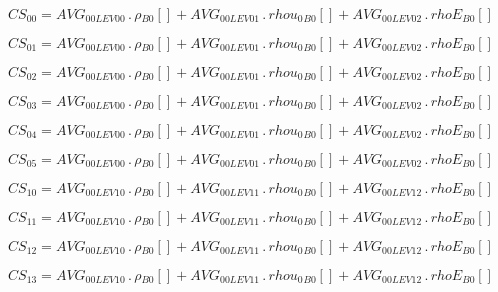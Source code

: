 \documentclass{article}
\begin{document}
\begin{dmath}CS_{00} = AVG_{0 0 LEV 00} \,.\, {\rho{_{B0}}}[{}] + AVG_{0 0 LEV 01} \,.\, {rhou_{0}{_{B0}}}[{}] + AVG_{0 0 LEV 02} \,.\, {rhoE{_{B0}}}[{}]\end{dmath}

\begin{dmath}CS_{01} = AVG_{0 0 LEV 00} \,.\, {\rho{_{B0}}}[{}] + AVG_{0 0 LEV 01} \,.\, {rhou_{0}{_{B0}}}[{}] + AVG_{0 0 LEV 02} \,.\, {rhoE{_{B0}}}[{}]\end{dmath}

\begin{dmath}CS_{02} = AVG_{0 0 LEV 00} \,.\, {\rho{_{B0}}}[{}] + AVG_{0 0 LEV 01} \,.\, {rhou_{0}{_{B0}}}[{}] + AVG_{0 0 LEV 02} \,.\, {rhoE{_{B0}}}[{}]\end{dmath}

\begin{dmath}CS_{03} = AVG_{0 0 LEV 00} \,.\, {\rho{_{B0}}}[{}] + AVG_{0 0 LEV 01} \,.\, {rhou_{0}{_{B0}}}[{}] + AVG_{0 0 LEV 02} \,.\, {rhoE{_{B0}}}[{}]\end{dmath}

\begin{dmath}CS_{04} = AVG_{0 0 LEV 00} \,.\, {\rho{_{B0}}}[{}] + AVG_{0 0 LEV 01} \,.\, {rhou_{0}{_{B0}}}[{}] + AVG_{0 0 LEV 02} \,.\, {rhoE{_{B0}}}[{}]\end{dmath}

\begin{dmath}CS_{05} = AVG_{0 0 LEV 00} \,.\, {\rho{_{B0}}}[{}] + AVG_{0 0 LEV 01} \,.\, {rhou_{0}{_{B0}}}[{}] + AVG_{0 0 LEV 02} \,.\, {rhoE{_{B0}}}[{}]\end{dmath}

\begin{dmath}CS_{10} = AVG_{0 0 LEV 10} \,.\, {\rho{_{B0}}}[{}] + AVG_{0 0 LEV 11} \,.\, {rhou_{0}{_{B0}}}[{}] + AVG_{0 0 LEV 12} \,.\, {rhoE{_{B0}}}[{}]\end{dmath}

\begin{dmath}CS_{11} = AVG_{0 0 LEV 10} \,.\, {\rho{_{B0}}}[{}] + AVG_{0 0 LEV 11} \,.\, {rhou_{0}{_{B0}}}[{}] + AVG_{0 0 LEV 12} \,.\, {rhoE{_{B0}}}[{}]\end{dmath}

\begin{dmath}CS_{12} = AVG_{0 0 LEV 10} \,.\, {\rho{_{B0}}}[{}] + AVG_{0 0 LEV 11} \,.\, {rhou_{0}{_{B0}}}[{}] + AVG_{0 0 LEV 12} \,.\, {rhoE{_{B0}}}[{}]\end{dmath}

\begin{dmath}CS_{13} = AVG_{0 0 LEV 10} \,.\, {\rho{_{B0}}}[{}] + AVG_{0 0 LEV 11} \,.\, {rhou_{0}{_{B0}}}[{}] + AVG_{0 0 LEV 12} \,.\, {rhoE{_{B0}}}[{}]\end{dmath}
\end{document}
